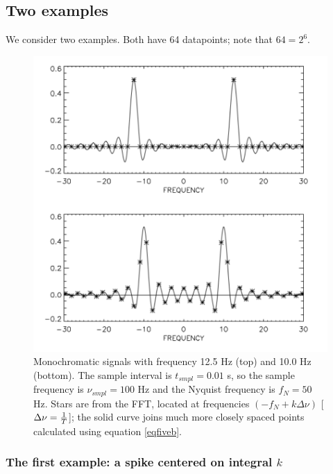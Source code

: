 \documentclass[11pt,preprint]{aastex}
\begin{document}
\subsection{Two examples}

	We consider two examples. Both have 64 datapoints; note that $64
= 2^6$.

\begin{figure}[H]
\begin{center}
\leavevmode
 \includegraphics[width=7.0in]{fig3.pdf}
\end{center}
\label{figthree}
\caption{Monochromatic signals with frequency 12.5 Hz (top) and 10.0 Hz
(bottom). The sample interval is $t_{smpl}= 0.01$ s, so the sample
frequency is $\nu_{smpl} = 100$ Hz and the Nyquist frequency is $f_N=50$
Hz. Stars are from the FFT, located at frequencies $(-f_N + k \Delta
\nu)$ [$\Delta \nu= {1 \over T}$]; the solid curve joins much more
closely spaced points calculated using equation \ref{eqfiveb}. } 
\end{figure}

\subsubsection{The first example: a spike centered on integral $k$}
\end{document}
